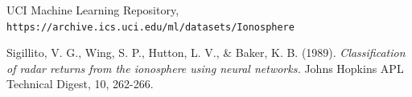 \documentclass[12pt]{article}
\begin{document}
\begin{thebibliography}{99} 
	
	UCI Machine Learning Repository,\\ \texttt{https://archive.ics.uci.edu/ml/datasets/Ionosphere}
	
	 Sigillito, V. G., Wing, S. P., Hutton, L. V., \& Baker, K. B. (1989). \textit{Classification of radar returns from the ionosphere using neural networks.} Johns Hopkins APL Technical Digest, 10, 262-266.
	
	
	
	
	
	
\end{thebibliography}
\end{document}
